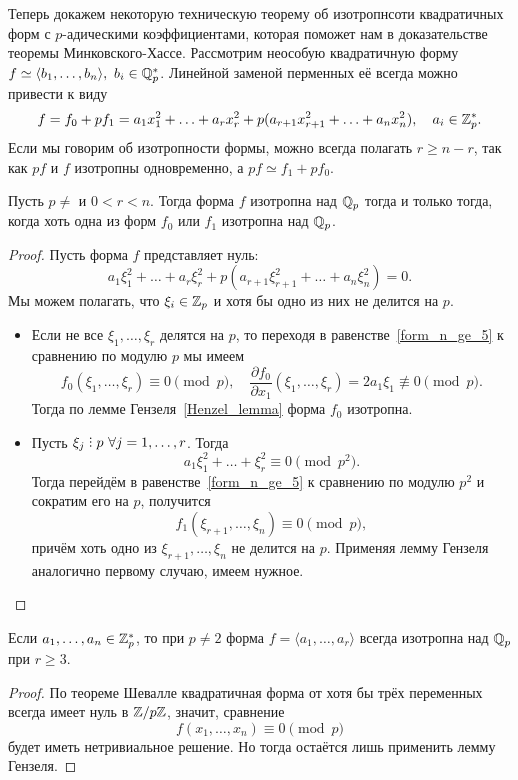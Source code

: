 	Теперь докажем некоторую техническую теорему об изотропнсоти квадратичных форм с $p$-адическими коэффициентами, которая поможет нам в доказательстве теоремы Минковского-Хассе.  	
	Рассмотрим неособую квадратичную форму $f \simeq \langle b_1, \ldots, b_n \rangle, \ b_i \in \mathbb{Q}_{p}^{*}$. Линейной заменой перменных её всегда можно привести к виду 
	\[
		f = f_0 + p f_1 = a_1 x_1^2 + \ldots + a_r x_r^2 + p(a_{r + 1}x_{r + 1}^2 + \ldots + a_{n} x_{n}^2), \quad a_i \in \mathbb{Z}_{p}^{*}.
	\]
	Если мы говорим об изотропности формы, можно всегда полагать $r \ge n - r$, так как $pf$ и $f$ изотропны одновременно, а $pf \simeq f_1 + pf_0$. 

	\begin{theorem}\label{f_0 + pf_1} 
	 	Пусть $p \neq $ и $0 < r < n$.  Тогда форма $f$ изотропна над $\mathbb{Q}_{p}$ тогда и только тогда, когда  хоть одна из форм $f_0$ или $f_1$ изотропна над $\mathbb{Q}_{p}$. 
	 \end{theorem} 
	 \begin{proof}
	 	Пусть форма $f$ представляет нуль:
	 	\begin{equation}
	 		a_1 \xi_1^2 + \ldots + a_r \xi_r^2 + p(a_{r + 1}\xi_{r + 1}^2 + \ldots + a_{n} \xi_{n}^2) = 0. \label{form_n_ge_5}
	 	\end{equation}
	 	Мы можем полагать, что $\xi_i \in \mathbb{Z}_{p}$ и хотя бы одно из них не делится на $p$. 

	 	\begin{itemize}
	 		\item Если не все $\xi_1, \ldots, \xi_r$ делятся на $p$, то переходя в равенстве~\eqref{form_n_ge_5} к сравнению по модулю $p$ мы имеем 
	 		\[
	 			f_0(\xi_1, \ldots, \xi_r) \equiv 0 \pmod{p}, \quad \frac{\partial f_0}{\partial x_1}(\xi_1, \ldots, \xi_r) = 2a_1 \xi_1 \not\equiv 0 \pmod{p}.
	 		\]
	 		Тогда по лемме Гензеля~\ref{Henzel_lemma} форма $f_0$ изотропна. 
	 		\item  Пусть $\xi_j \divby p \ \forall j = 1, \ldots, r$. Тогда 
	 		\[
	 			a_1 \xi_1^2 + \ldots + \xi_r^2 \equiv  0 \pmod{p^2}.
	 		\]
	 		Тогда перейдём в равенстве~\eqref{form_n_ge_5} к сравнению по модулю $p^2$ и сократим его на $p$, получится 
	 		\[
	 			f_1(\xi_{r + 1}, \ldots, \xi_n) \equiv 0 \pmod{p},
	 		\]
	 		причём хоть одно из $\xi_{r + 1}, \ldots, \xi_n$ не делится на $p$. Применяя лемму Гензеля аналогично первому случаю, имеем нужное. 
	 	\end{itemize}
	 \end{proof}

	 \begin{corollary}\label{r_ge_3}
	 	Если $a_1, \ldots, a_n \in \mathbb{Z}_{p}^{*}$, то при $p \neq 2$ форма $f = \langle a_1, \ldots, a_{r} \rangle$ всегда изотропна над $\mathbb{Q}_{p}$ при $r \ge 3$.
	 \end{corollary}
	 \begin{proof}
	 	По теореме Шевалле квадратичная форма от хотя бы  трёх переменных всегда имеет нуль в $\mathbb{Z}/p\mathbb{Z}$, значит, сравнение 
	 	\[
	 		f(x_1, \ldots, x_n) \equiv 0 \pmod{p}
	 	\]
	 	будет иметь нетривиальное решение. Но тогда остаётся лишь применить лемму Гензеля. 
	 	
	 \end{proof}

